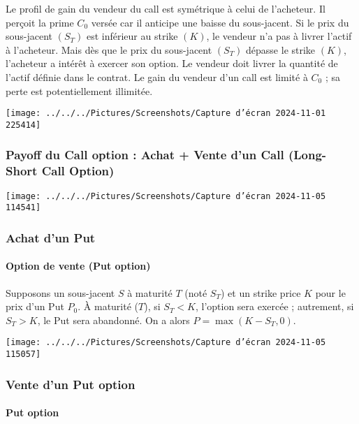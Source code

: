 \documentclass[a4paper, 12pt]{report}
\begin{document}
Le profil de gain du vendeur du call est symétrique à celui de l’acheteur. Il perçoit la prime \( C_0 \) versée car il anticipe une baisse du sous-jacent. Si le prix du sous-jacent \( (S_T) \) est inférieur au strike \( (K) \), le vendeur n’a pas à livrer l’actif à l’acheteur. Mais dès que le prix du sous-jacent \( (S_T) \) dépasse le strike \( (K) \), l’acheteur a intérêt à exercer son option. Le vendeur doit livrer la quantité de l’actif définie dans le contrat. Le gain du vendeur d’un call est limité à \( C_0 \) ; sa perte est potentiellement illimitée.

\texttt{[image: ../../../Pictures/Screenshots/Capture d'écran 2024-11-01 225414]}

\subsubsection{Payoff du Call option : Achat + Vente d’un Call (Long-Short Call Option)}

\begin{center}
	\texttt{[image: ../../../Pictures/Screenshots/Capture d'écran 2024-11-05 114541]}
\end{center}

\subsubsection{Achat d’un Put}

\paragraph{Option de vente (Put option)}

Supposons un sous-jacent \( S \) à maturité \( T \) (noté \( S_T \)) et un strike price \( K \) pour le prix d’un Put \( P_0 \). À maturité (\( T \)), si \( S_T < K \), l’option sera exercée ; autrement, si \( S_T > K \), le Put sera abandonné. On a alors \( P = \max(K - S_T, 0) \).

\begin{center}
	\texttt{[image: ../../../Pictures/Screenshots/Capture d'écran 2024-11-05 115057]}
\end{center}

\subsubsection{Vente d’un Put option}

\paragraph{Put option}
\end{document}

